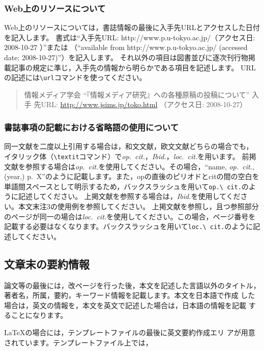\documentclass[b5paper,10pt,twocolumn,tombow]{jarticle}
\begin{document}
\subsubsection{Web上のリソースについて}
Web上のリソースについては，書誌情報の最後に入手先URLとアクセスした日付を記入します。
書式は``入手先URL: http://www.p.u-tokyo.ac.jp/（アクセス日: 2008-10-27 ）''または
（``available from http://www.p.u-tokyo.ac.jp/ (accessed date: 2008-10-27)''）を記入します。
それ以外の項目は図書並びに逐次刊行物掲載記事の規定に準じ，入手先の情報から明らかである項目を記述します。
URLの記述には\verb|\url|コマンドを使ってください。

\begin{quote}
  情報メディア学会 ``『情報メディア研究』への各種原稿の投稿について'' 入手
  先URL: \url{http://www.jsims.jp/toko.html} （アクセス日: 2008-10-27）
\end{quote}

\subsubsection{書誌事項の記載における省略語の使用について}

同一文献を二度以上引用する場合は，和文文献，欧文文献どちらの場合でも，
イタリック体（\verb|\textit|コマンド）で\textit{op.\ cit.}，\textit{Ibid.}，\textit{loc.\ cit.}を用います。
前掲文献を参照する場合は\textit{op.\ cit.}を使用してください。その場合，``name, \textit{op.\ cit.}, (year,) p.~X''のように記載します。また，opの直後のピリオドとcitの間の空白を単語間スペースとして明示するため，バックスラッシュを用いて\verb|op.\ cit.|のように記述してください。
上掲文献を参照する場合は，\textit{Ibid.}を使用してください。本文末注3の使用例を参照してください。
上掲文献を参照し，且つ参照部分のページが同一の場合は\textit{loc.\ cit.}を使用してください。この場合，ページ番号を記載する必要はなくなります。バックスラッシュを用いて\verb|loc.\ cit.|のように記述してください。

\subsection{文章末の要約情報}
論文等の最後には，改ページを行った後，本文を記述した言語以外のタイトル，
著者名，所属，要約，キーワード情報を記載します。本文を日本語で作成
した場合は，英文の情報を，本文を英文で記述した場合は，日本語の情報を記載
することになります。

\LaTeX{}の場合には，テンプレートファイルの最後に英文要約作成エリ
アが用意されています。テンプレートファイル上では，
\end{document}
